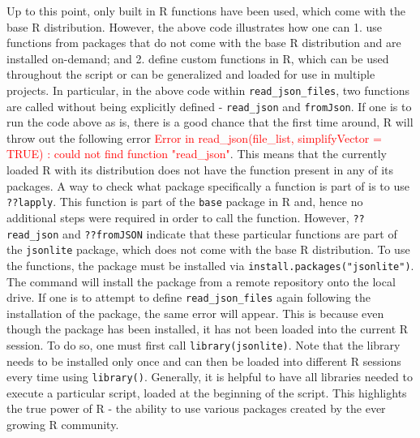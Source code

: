 Up to this point, only built in R functions have been used, which come with the base R distribution. However, the above code illustrates how one can 1. use functions from packages that do not come with the base R distribution and are installed on-demand; and 2. define custom functions in R, which can be used throughout the script or can be generalized and loaded for use in multiple projects. In particular, in the above code within \verb|read_json_files|, two functions are called without being explicitly defined - \verb|read_json| and \verb|fromJson|. If one is to run the code above as is, there is a good chance that the first time around, R will throw out the following error \textcolor{red}{Error in read\_json(file\_list, simplifyVector = TRUE) : could not find function "read\_json"}. This means that the currently loaded R with its distribution does not have the function present in any of its packages. A way to check what package specifically a function is part of is to use \verb|??lapply|. This function is part of the \verb|base| package in R and, hence no additional steps were required in order to call the function. However, \verb|??read_json| and \verb|??fromJSON| indicate that these particular functions are part of the \verb|jsonlite| \cite{jsonlite} package, which does not come with the base R distribution. To use the functions, the package must be installed via \verb|install.packages("jsonlite")|. The command will install the package from a remote repository onto the local drive. If one is to attempt to define \verb|read_json_files| again following the installation of the package, the same error will appear. This is because even though the package has been installed, it has not been loaded into the current R session. To do so, one must first call \verb|library(jsonlite)|. Note that the library needs to be installed only once and can then be loaded into different R sessions every time using \verb|library()|. Generally, it is helpful to have all libraries needed to execute a particular script, loaded at the beginning of the script. This highlights the true power of R - the ability to use various packages created by the ever growing R community.

